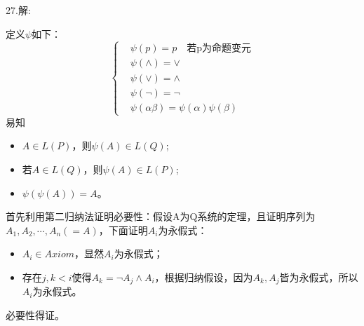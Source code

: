 \documentclass[a4paper]{ctexart}
\begin{document}
\noindent 27.解:

定义$\psi$如下：$$
\left\{
  \begin{aligned}
    &\psi(p)=p\quad\text{若p为命题变元} \\
    &\psi(\wedge) = \vee \\ 
    &\psi(\vee)=\wedge \\
    &\psi(\neg) =\neg \\
    &\psi(\alpha\beta)=\psi(\alpha)\psi(\beta)
  \end{aligned}
\right.
$$
易知
\begin{itemize}
  \item $A\in L(P)$，则$\psi(A)\in L(Q)$;
  \item 若$A\in L(Q)$，则$\psi(A)\in L(P)$;
  \item $\psi(\psi(A))=A$。
\end{itemize}

首先利用第二归纳法证明必要性：假设A为Q系统的定理，且证明序列为$A_1,A_2,\cdots,A_n(=A)$，下面证明$A_i$为永假式：
\begin{itemize}
  \item $A_i\in Axiom$，显然$A_i$为永假式；
  \item 存在$j,k<i$使得$A_k=\neg A_j\wedge A_i$，根据归纳假设，因为$A_k,A_j$皆为永假式，所以$A_i$为永假式。
\end{itemize}
必要性得证。
\end{document}
